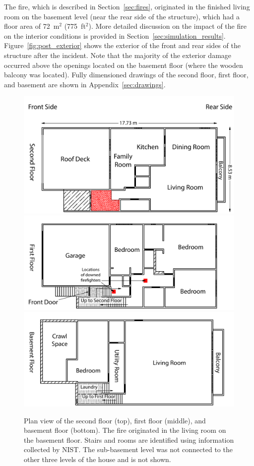 \documentclass[12pt,oneside]{book}
\begin{document}
The fire, which is described in Section~\ref{sec:fires}, originated in the finished living room on the basement level (near the rear side of the structure), which had a floor area of 72~m$^2$ (775~ft$^2$). More detailed discussion on the impact of the fire on the interior conditions is provided in Section~\ref{sec:simulation_results}. Figure~\ref{fig:post_exterior} shows the exterior of the front and rear sides of the structure after the incident. Note that the majority of the exterior damage occurred above the openings located on the basement floor (where the wooden balcony was located). Fully dimensioned drawings of the second floor, first floor, and basement are shown in Appendix~\ref{sec:drawings}.


\clearpage


\begin{figure}[!ht]
\includegraphics[width=5.0in]{../Figures/Plan_Second_Floor}
\includegraphics[width=5.0in]{../Figures/Plan_First_Floor}
\includegraphics[width=5.0in]{../Figures/Plan_Basement_Floor}
\caption[Plan view of the second floor, first floor, and basement floor.]
{Plan view of the second floor (top), first floor (middle), and basement floor (bottom). The fire originated in the living room on the basement floor. Stairs and rooms are identified using information collected by NIST. The sub-basement level was not connected to the other three levels of the house and is not shown.}
\label{fig:floor_plan}
\end{figure}
\end{document}
